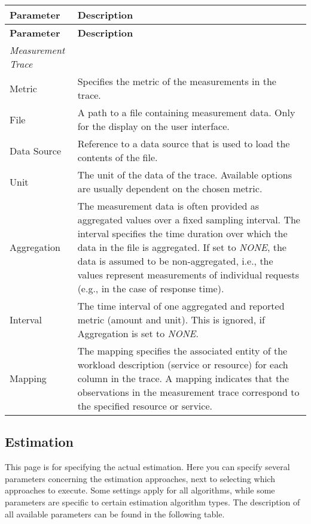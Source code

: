     \begin{tabularx}{\textwidth}{lX}
        \toprule
        \textbf{Parameter} & \textbf{Description} \\
        \midrule
        \endfirsthead %
        \toprule
        \textbf{Parameter} & \textbf{Description} \\
        \midrule
        \endhead %
        \bottomrule
        \endfoot
        \textit{Measurement Trace} \\
        Metric &  Specifies the metric of the measurements in the
        trace.\\
        File &  A path to a file containing measurement data.
        Only for the display on the user interface. \\
        Data Source &  Reference to a data source that is used to load the contents of the file. \\
        Unit & The unit of the data of the trace. Available options are usually dependent on the chosen metric.\\
        Aggregation & The measurement data is often provided as aggregated
        values over a fixed sampling interval. The
        interval specifies the time duration over which the
        data in the file is aggregated. If set to \textit{NONE}, the data
        is assumed to be non-aggregated, i.e., the values
        represent measurements of individual requests (e.g.,
        in the case of response time).
\\
        Interval & The time interval of one aggregated and reported metric (amount and unit). This is ignored, if Aggregation is set to \textit{NONE}.\\
        Mapping & The mapping specifies the associated entity of the
        workload description (service or resource) for each
        column in the trace. A mapping indicates that the observations in the measurement trace
        correspond to the specified resource or service.
\\
    \end{tabularx}

\subsection{Estimation}
This page is for specifying the actual estimation. Here you can specify several parameters concerning the estimation approaches, next to selecting which approaches to execute.
Some settings apply for all algorithms, while some parameters are specific to certain estimation algorithm types.
The description of all available parameters can be found in the following table.

